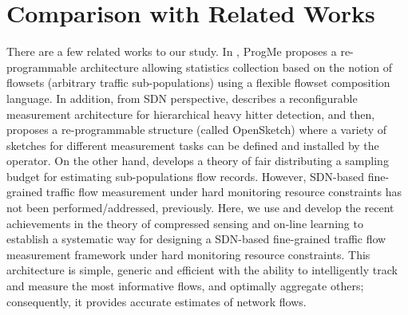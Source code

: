 \section{Comparison with Related Works}\label{sec:RelatedWorks}
There are a few related works to our study. In \cite{ProgMe:2011}, ProgMe proposes a re-programmable architecture allowing statistics collection based on the notion of flowsets (arbitrary traffic sub-populations) using a flexible flowset composition language. In addition, from SDN perspective, \cite{MYu:2011} describes a reconfigurable measurement architecture for hierarchical heavy hitter detection, and then, \cite{MYu:2013} proposes a re-programmable structure (called OpenSketch) where a variety of sketches for different measurement tasks can be defined and installed by the operator. On the other hand, \cite{Duffield:2012} develops a theory of fair distributing a sampling budget for estimating sub-populations flow records. However, SDN-based fine-grained traffic flow measurement under hard monitoring resource constraints has not been performed/addressed, previously. Here, we use and develop the recent achievements in the theory of compressed sensing and on-line learning to establish a systematic way for designing a SDN-based fine-grained traffic flow measurement framework under hard monitoring resource constraints. This architecture is simple, generic and efficient with the ability to intelligently track and measure the most informative flows, and optimally aggregate others; consequently, it provides accurate estimates of network flows. 
%
